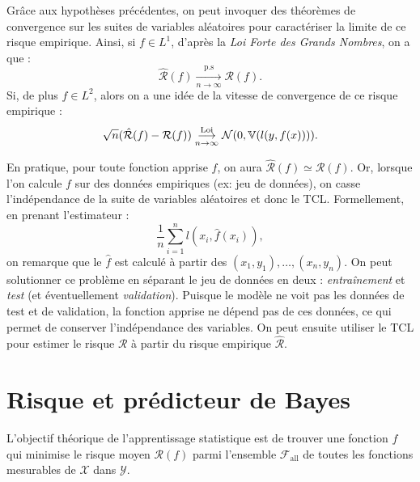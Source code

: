\begin{proposition}[Convergence]
    Grâce aux hypothèses précédentes, on peut invoquer des théorèmes de convergence sur les suites de variables aléatoires pour caractériser la limite de ce risque empirique. 
    Ainsi, si $ f \in L^1$, d'après la \emph{Loi Forte des Grands Nombres}, on a que : 
    \begin{equation}
        \hat{ \mathcal{R}}(f) \underset{n \to \infty}{\overset{\text{p.s}}{\longrightarrow}} \mathcal{R}(f).
    \end{equation}
    Si, de plus $f \in L^2$, alors on a une idée de la vitesse de convergence de ce risque empirique : 
    \begin{equation}
        \sqrt{n}(\hat{ \mathcal{R}}(f) - \mathcal{R}(f)) \underset{n \to \infty}{\overset{\text{Loi}}{\longrightarrow}} \mathcal{N}(0, \mathbb{V}(l(y, f(x)))).
    \end{equation}
\end{proposition}

\begin{remark}[Indépendance]
    En pratique, pour toute fonction apprise $f$, on aura $ \hat{ \mathcal{R}}(f) \simeq \mathcal{R}(f)$. Or, lorsque l'on calcule $f$ sur des données empiriques (ex: jeu de données), on casse l'indépendance de la suite de variables aléatoires et donc le TCL. Formellement, en prenant l'estimateur : 
    $$ \frac{1}{n} \sum_{i=1}^{n} l(x_i, \hat{f}(x_i)), $$ 
    on remarque que le $\hat{f}$ est calculé à partir des $(x_1, y_1), \dots, (x_n, y_n)$. On peut solutionner ce problème en séparant le jeu de données en deux : \emph{entraînement} et \emph{test} (et éventuellement \emph{validation}). Puisque le modèle ne voit pas les données de test et de validation, la fonction apprise ne dépend pas de ces données, ce qui permet de conserver l'indépendance des variables. On peut ensuite utiliser le TCL pour estimer le risque $\mathcal{R}$ à partir du risque empirique $\hat{\mathcal{R}}$. 
\end{remark}


\section{Risque et prédicteur de Bayes}

L'objectif théorique de l'apprentissage statistique est de trouver une fonction $f$ qui minimise le risque moyen $\mathcal{R}(f)$ parmi l'ensemble $\mathcal{F}_{\text{all}}$ de toutes les fonctions mesurables de $\mathcal{X}$ dans $\mathcal{Y}$. 

